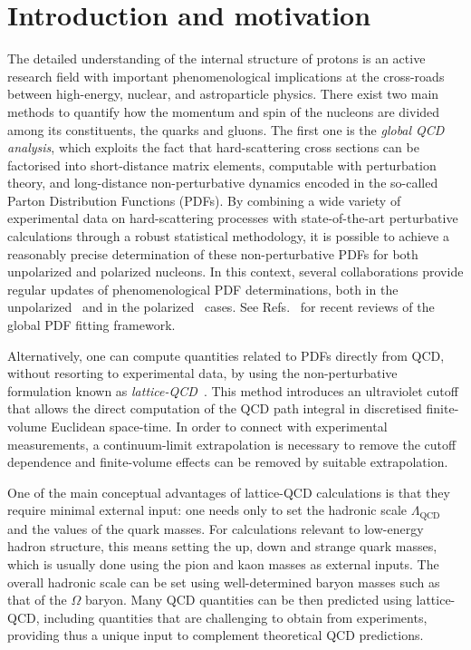 \section{Introduction and motivation}

The detailed understanding of the internal structure of protons is an active
research field with important phenomenological implications
at the cross-roads between high-energy, nuclear, and astroparticle physics.
%
There exist two main methods to quantify how the momentum and spin of
the nucleons
are divided among its constituents, the quarks and gluons.
%
The first one
is the {\it global QCD analysis}, which exploits the fact that hard-scattering
cross sections can be factorised into short-distance matrix elements,
computable with perturbation theory, and long-distance
non-perturbative dynamics encoded in the
so-called Parton Distribution Functions (PDFs).
%
By combining a wide variety of experimental data on hard-scattering processes
with state-of-the-art perturbative calculations through a robust statistical
methodology, it is possible to achieve a reasonably precise determination
of these non-perturbative PDFs for both unpolarized and polarized nucleons.
%
In this context, several collaborations provide regular updates of
phenomenological PDF determinations, both
in the unpolarized~\cite{Ball:2014uwa,Ball:2017nwa,Harland-Lang:2014zoa,
Dulat:2015mca,Alekhin:2017kpj,Owens:2012bv} and in
the polarized~\cite{Nocera:2014gqa,deFlorian:2009vb,
  Sato:2016tuz,Hirai:2008aj} cases.
%
See Refs.~\cite{Rojo:2015acz,Butterworth:2015oua,Ball:2012wy,
Alekhin:2011sk,Forte:2013wc,Forte:2010dt,Perez:2012um,DeRoeck:2011na,
Accardi:2016ndt} for recent reviews of the global PDF fitting framework.

Alternatively, one can compute quantities related to PDFs directly 
from QCD, without resorting to
experimental data, by using the non-perturbative formulation known as
{\it lattice-QCD}~\cite{Olive:2016xmw,Gupta:1997nd}.
%
This method introduces an ultraviolet cutoff that allows the direct 
computation of the QCD path integral in discretised finite-volume 
Euclidean space-time.
%
In order to connect with experimental measurements, a 
continuum-limit extrapolation is necessary to remove the cutoff dependence 
and finite-volume effects can be removed by suitable extrapolation.

One of the main
conceptual advantages of lattice-QCD calculations is that
they require minimal external input: one needs only to 
set the hadronic scale $\Lambda_\text{QCD}$ and the values of the quark masses.
%
For calculations relevant to low-energy hadron structure, this means
setting the up, down and strange quark masses,
which is usually done using the pion and kaon masses as external inputs.
%
The overall hadronic scale can be set using well-determined baryon masses 
such as that of the $\Omega$ baryon.
%
Many QCD quantities can be then predicted 
using lattice-QCD, including quantities that are challenging to obtain from
experiments, providing thus a unique input to complement theoretical QCD
predictions.

